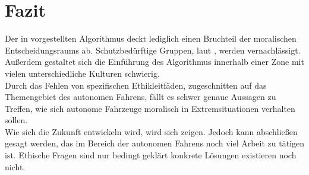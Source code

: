 \section{Fazit}
\label{sec:fazit}

Der in \citeauthor{votingBasedSystem} vorgestellten Algorithmus deckt lediglich einen Bruchteil der moralischen Entscheidungsraums ab. Schutzbedürftige Gruppen, laut \cite{ec2019ethics}, werden vernachlässigt. Außerdem gestaltet sich die Einführung des Algorithmus innerhalb einer Zone mit vielen unterschiedliche Kulturen schwierig.\\

Durch das Fehlen von spezifischen Ethikleitfäden, zugeschnitten auf das Themengebiet des autonomen Fahrens, fällt es schwer genaue Aussagen zu Treffen, wie sich autonome Fahrzeuge moralisch in Extremsituationen verhalten sollen.\\

Wie sich die Zukunft entwickeln wird, wird sich zeigen. Jedoch kann abschließen gesagt werden, das im Bereich der autonomen Fahrens noch viel Arbeit zu tätigen ist. Ethische Fragen sind nur bedingt geklärt konkrete Lösungen existieren noch nicht.
